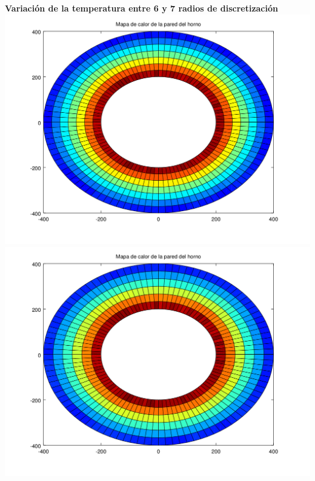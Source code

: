 \begin{enumerate}
  	\textbf{Variación de la temperatura entre 6 y 7 radios de discretización}\\
	\includegraphics[scale=0.35]{experimentos1a_1b/evolucion_posicion_isoterma_temperatura/test2/test6_006_radios_inst_001_heatmap.png}
	\includegraphics[scale=0.35]{experimentos1a_1b/evolucion_posicion_isoterma_temperatura/test2/test6_007_radios_inst_001_heatmap.png}


\end{enumerate}
